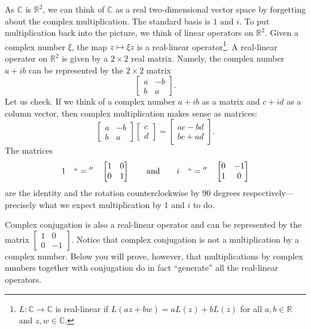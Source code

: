 \documentclass[12pt,openany]{book}
\newcommand{\C}{{\mathbb{C}}}
\newcommand{\R}{{\mathbb{R}}}
\newcommand{\myquote}[1]{``#1''}
\theoremstyle{plain}
\theoremstyle{remark}
\theoremstyle{definition}
\theoremstyle{exercise}
\theoremstyle{example}
\begin{document}
As $\C$ is $\R^2$, we can think of
$\C$ as a real two-dimensional vector space by forgetting about the
complex multiplication.  The standard basis is $1$ and $i$.
To put multiplication back into the picture, we think of linear operators
on $\R^2$.
Given a complex number $\xi$, the map $z \mapsto  \xi z$ is a
real-linear operator\footnote{$L \colon \C \to \C$ is real-linear if
$L(a z + b w) = aL(z)+bL(z)$ for all $a,b \in \R$ and $z,w \in \C$.}.
A real-linear operator on $\R^2$ is given by a $2 \times 2$ real
matrix.
Namely, the complex number $a+ib$ can be represented by the $2 \times 2$ matrix
\begin{equation} \label{eq:complexnumbermatrix}
\begin{bmatrix}
a & -b \\
b & a
\end{bmatrix} .
\end{equation}
Let us check.
If we think of a complex number $a+ib$ as a matrix
and $c+id$ as a column vector,
then complex multiplication makes sense as matrices:
\begin{equation*}
\begin{bmatrix}
a & -b \\
b & a
\end{bmatrix}
\begin{bmatrix}
c \\
d 
\end{bmatrix}
=
\begin{bmatrix}
ac-bd \\
bc+ad
\end{bmatrix} .
\end{equation*}
The matrices
\begin{equation*}
1 \quad ``{}={}'' \quad
\begin{bmatrix}
1 & 0 \\
0 & 1
\end{bmatrix} \qquad \text{and} \qquad
i \quad ``{}={}'' \quad
\begin{bmatrix}
0 & -1 \\
1 & 0
\end{bmatrix} 
\end{equation*}
are the identity and the rotation counterclockwise by $90$ degrees
respectively---precisely what we expect multiplication by $1$ and $i$
to do.

Complex conjugation is also a real-linear
operator and can be represented by the matrix $\left[ \begin{smallmatrix} 1 & 0 \\ 0 &
-1 \end{smallmatrix} \right]$.  Notice that complex conjugation is
not a multiplication by a complex number.
Below you will prove, however,
that multiplications by complex numbers together with conjugation do 
in fact \myquote{generate} all the real-linear operators.
\end{document}
